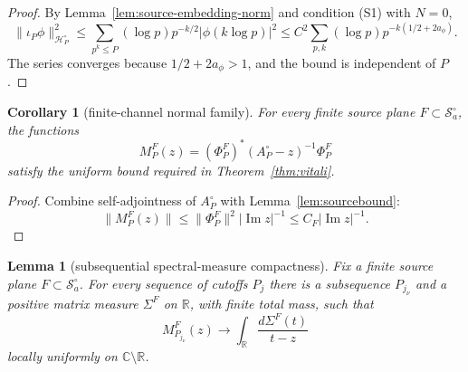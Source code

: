 \documentclass[11pt]{amsart}
\newtheorem{lemma}[theorem]{Lemma}
\newtheorem{corollary}[theorem]{Corollary}
\theoremstyle{definition}
\theoremstyle{remark}
\theoremstyle{definition}
\renewcommand{\Im}{\operatorname{Im}}
\newcommand{\cH}{\mathcal{H}}
\newcommand{\cS}{\mathcal{S}}
\newcommand{\R}{\mathbb{R}}
\newcommand{\C}{\mathbb{C}}
\begin{document}
\begin{proof}
By Lemma~\ref{lem:source-embedding-norm} and condition \textnormal{(S1)} with $N=0$,
\[
   \|\iota_P\phi\|_{\cH_P^\circ}^2\le
   \sum_{p^k\le P}(\log p)p^{-k/2}|\phi(k\log p)|^2
   \le
   C^2\sum_{p,k}(\log p)p^{-k(1/2+2a_\phi)}.
\]
The series converges because $1/2+2a_\phi>1$, and the bound is independent of $P$.
\end{proof}

\begin{corollary}[finite-channel normal family]\label{cor:normal}
For every finite source plane $F\subset\cS_a^\circ$, the functions
\[
   M_P^F(z)=(\Phi_P^F)^*(A_P^\circ-z)^{-1}\Phi_P^F
\]
satisfy the uniform bound required in Theorem~\ref{thm:vitali}.
\end{corollary}

\begin{proof}
Combine self-adjointness of $A_P^\circ$ with Lemma~\ref{lem:sourcebound}:
\[
   \|M_P^F(z)\|\le \|\Phi_P^F\|^2|\Im z|^{-1}\le C_F|\Im z|^{-1}.
\]
\end{proof}

\begin{lemma}[subsequential spectral-measure compactness]\label{lem:helly-cauchy}
Fix a finite source plane $F\subset\cS_a^\circ$.  For every sequence of cutoffs $P_j$ there is a
subsequence $P_{j_\nu}$ and a positive matrix measure $\Sigma^F$ on $\R$, with finite total mass, such
that
\[
   M_{P_{j_\nu}}^F(z)
   \longrightarrow
   \int_\R\frac{d\Sigma^F(t)}{t-z}
\]
locally uniformly on $\C\setminus\R$.
\end{lemma}
\end{document}
